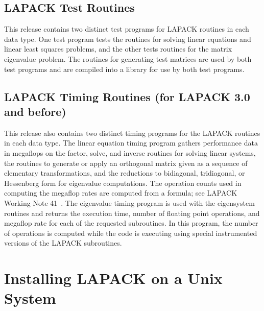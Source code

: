 \documentclass[11pt]{report}
\begin{document}
\subsection{LAPACK Test Routines}

This release contains two distinct test programs for LAPACK routines
in each data type.  One test program tests the routines for solving
linear equations and linear least squares problems,
and the other tests routines for the matrix eigenvalue problem.
The routines for generating test matrices are used by both test
programs and are compiled into a library for use by both test programs.

\subsection{LAPACK Timing Routines (for LAPACK 3.0 and before) }

This release also contains two distinct timing programs for the
LAPACK routines in each data type. 
The linear equation timing program gathers performance data in
megaflops on the factor, solve, and inverse routines for solving
linear systems, the routines to generate or apply an orthogonal matrix
given as a sequence of elementary transformations, and the reductions
to bidiagonal, tridiagonal, or Hessenberg form for eigenvalue
computations.
The operation counts used in computing the megaflop rates are computed
from a formula;
see LAPACK Working Note 41~\cite{WN41}.
The eigenvalue timing program is used with the eigensystem routines
and returns the execution time, number of floating point operations, and
megaflop rate for each of the requested subroutines.
In this program, the number of operations is computed while the
code is executing using special instrumented versions of the LAPACK
subroutines.

\section{Installing LAPACK on a Unix System}\label{installation}
\end{document}
